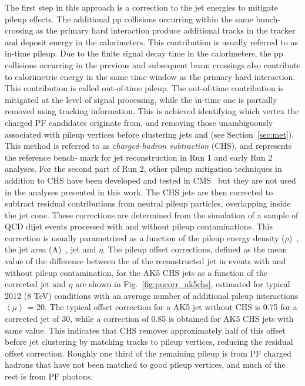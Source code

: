The first step in this approach is a correction to the jet energies to mitigate pileup effects. The additional pp collisions occurring within the same bunch-crossing as the primary hard interaction produce additional tracks in the tracker and deposit energy in the calorimeters. This contribution is usually referred to as in-time pileup. Due to the finite signal decay time in the calorimeters, the pp collisions occurring in the previous and subsequent beam crossings also contribute to calorimetric energy in the same time window as the primary hard interaction. This contribution is called out-of-time pileup.
The out-of-time contribution is mitigated at the level of signal processing, while the in-time one is partially removed using tracking information. This is achieved identifying which vertex the charged PF candidates originate from, and removing those unambiguously associated with pileup vertices before clustering jets and \ptvecmiss (see Section~\ref{sec:met}). This method is referred to as {\it charged-hadron subtraction} (CHS), and represents the reference bench- mark for jet reconstruction in Run 1 and early Run 2 analyses. For the second part of Run 2, other pileup mitigation techniques in addition to CHS have been developed and tested in CMS~\cite{CMS-PAS-JME-13-005,CMS-PAS-JME-14-001,JME-16-003} but they are not used in the analyses presented in this work. 
The CHS jets are then corrected to subtract residual contributions from neutral pileup particles, overlapping inside the jet cone. These corrections are determined from the simulation of a sample of QCD dijet events processed with and without pileup contaminations. This correction is usually parametrized as a function of the pileup energy density ($\rho$)~\cite{Cacciari:2011ma,Cacciari:2005hq}, the jet area (A)~\cite{Cacciari:2007fd}, jet \pt and $\eta$. The pileup offset corrections, defined as the mean value of the difference between the \pt of the reconstructed jet in events with and without pileup contamination, for the AK5 CHS jets as a function of the corrected jet \pt and $\eta$ are shown in Fig.~\ref{fig:pucorr_ak5chs}, estimated for typical 2012 (8 TeV) conditions with an average number of additional pileup interactions $\left\langle\mu\right\rangle$ = 20.
The typical offset correction for a AK5 jet without CHS is 0.75 for a corrected jet \pt of 30\GeV, while a correction of 0.85 is obtained for AK5 CHS jets with same \pt value. This indicates that CHS removes approximately half of this offset before jet clustering by matching tracks to pileup vertices, reducing the residual offset correction. Roughly one third of the remaining pileup is from PF charged hadrons that have not been matched to good pileup vertices, and much of the rest is from PF photons. 

